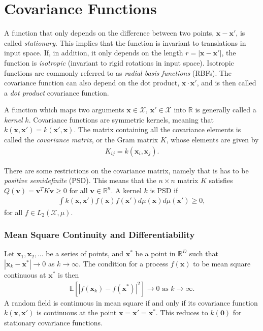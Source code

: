 \documentclass[twoside,english]{uiofysmaster}
\begin{document}
\section{Covariance Functions}
A function that only depends on the difference between two points, $\textbf{x} - \textbf{x}'$, is called \textit{stationary}. This implies that the function is invariant to translations in input space. If, in addition, it only depends on the length $r=|\textbf{x}-\textbf{x}'|$, the function is \textit{isotropic} (invariant to rigid rotations in input space).  Isotropic functions are commonly referred to as \textit{radial basis functions} (RBFs). The covariance function can also depend on the dot product, $\textbf{x} \cdot \textbf{x}'$, and is then called a \textit{dot product} covariance function.

A function which maps two arguments $\textbf{x} \in \mathcal{X}$, $\textbf{x}' \in \mathcal{X}$ into $\mathbb{R}$ is generally called a \textit{kernel} $k$. Covariance functions are symmetric kernels, meaning that $k(\textbf{x}, \textbf{x}') = k(\textbf{x}', \textbf{x})$. The matrix containing all the covariance elements is called the \textit{covariance matrix}, or the Gram matrix $K$, whose elements are given by
\begin{align}\label{Eq:: covariance matrix}
K_{ij} = k(\textbf{x}_i, \textbf{x}_j).
\end{align}

There are some restrictions on the covariance matrix, namely that is has to be \textit{positive semidefinite} (PSD). This means that the $n \times n $ matrix $K$ satisfies $Q(\textbf{v}) = \textbf{v}^T K \textbf{v} \geq 0 $ for all $\textbf{v} \in \mathbb{R}^n$. A kernel $k$ is PSD if
\begin{align}\label{Eq:: PSD kernel}
\int k(\textbf{x}, \textbf{x}') f(\textbf{x}) f(\textbf{x}') d \mu (\textbf{x}) d \mu (\textbf{x}') \geq 0,
\end{align}
for all $f \in L_2(\mathcal{X}, \mu)$.

\subsubsection{Mean Square Continuity and Differentiability}

Let $\textbf{x}_1, \textbf{x}_2,...$ be a series of points, and $\textbf{x}^*$ be a point in $\mathbb{R}^D$ such that $|\textbf{x}_k - \textbf{x}^*| \rightarrow 0$ as $k \rightarrow \infty$. The condition for a process $f(\textbf{x})$ to be mean square continuous at $\textbf{x}^*$ is then
\begin{align}
\mathbb{E}[|f(\textbf{x}_k)-f(\textbf{x}^*)|^2] \rightarrow 0 \text{ as } k \rightarrow \infty.
\end{align} 
A random field is continuous in mean square if and only if its covariance function $k(\textbf{x}, \textbf{x}')$ is continuous at the point $\textbf{x} = \textbf{x}' = \textbf{x}^*$. This reduces to $k(\boldsymbol{0})$ for stationary covariance functions.
\end{document}
